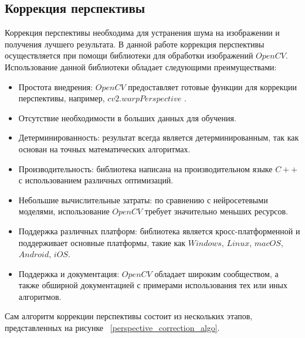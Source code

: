 \subsection{Коррекция перспективы}

Коррекция перспективы необходима для устранения шума на изображении и получения лучшего результата. 
В данной работе коррекция перспективы осуществляется при помощи библиотеки для обработки изображений $OpenCV$. Использование данной библиотеки обладает следующими преимуществами:
\begin{itemize}
    \item Простота внедрения: $OpenCV$ предоставляет готовые функции для коррекции перспективы, например, $cv2.warpPerspective$ \cite{opencv_perspective_transform}.
    \item Отсутствие необходимости в больших данных для обучения.
    \item Детерминированность: результат всегда является детерминированным, так как основан на точных математических алгоритмах.
    \item Производительность: библиотека написана на производительном языке $C++\;$ с использованием различных оптимизаций.
    \item Небольшие вычислительные затраты: по сравнению с нейросетевыми моделями, использование $OpenCV$ требует значительно меньших ресурсов.
    \item Поддержка различных платформ: библиотека является кросс-платформенной и поддерживает основные платформы, такие как $Windows$, $Linux$, $macOS$, $Android$, $iOS$.
    \item Поддержка и документация: $OpenCV$ обладает широким сообществом, а также обширной документацией с примерами использования тех или иных алгоритмов.
\end{itemize}

Сам алгоритм коррекции перспективы состоит из нескольких этапов, представленных на рисунке ~\ref{perspective_correction_algo}. 

